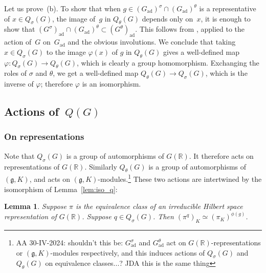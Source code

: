 \documentclass[10pt,leqno]{article}
\newtheorem{lemma}[equation]{Lemma}
\newcommand{\ad}{\mathrm{ad}}
\newcommand{\Gad}{G_\mathrm{ad}}
\newcommand{\R}{\mathbb R}
\newcommand{\g}{\mathfrak g}
\begin{document}
Let us prove~(b). To show that when $g\in (\Gad)^\sigma \cap (\Gad)^\theta$ is a representative of $x \in Q_{\sigma}(G)$,  the image of~$g$ in  $Q_\theta(G)$ depends only on~$x$, it is enough to show that  $(G^\sigma)_\ad \cap (\Gad)^\theta \subset (G^\theta)_{\ad}$. This follows from \cite[Proposition 5.4]{galois}, applied to the action of~$G$ on~$\Gad$ and the obvious involutions. We conclude that taking $x \in Q_{\sigma}(G)$ to the image $\varphi(x)$ of $g$ in $Q_{\theta}(G)$ gives a well-defined map $\varphi\colon Q_{\sigma}(G)\to Q_{\theta}(G)$, which is clearly a group homomorphism. Exchanging the roles of $\sigma$ and $\theta$, we get a well-defined map $Q_{\theta}(G) \to Q_{\sigma}(G)$, which is the inverse of $\varphi$; therefore $\varphi$ is an isomorphism.

%


\subsection{Actions of~$Q(G)$}


\subsubsection*{On representations} 



Note that $Q_\sigma(G)$ is a group of automorphisms of $G(\R)$. It therefore acts on representations of $G(\R)$. 
Similarly $Q_\theta(G)$ is a group of automorphisms of $(\g,K)$, and acts on $(\g,K)$-modules.\footnote{AA 30-IV-2024: shouldn't this be:  $\Gad^\sigma$ and $\Gad^\theta$  act on $G(\R)$-representations or $(\g,K)$-modules respectively, and this induces actions of $Q_{\sigma}(G)$ and $Q_{\theta}(G)$ on equivalence classes...? JDA this is the same thing}
These two actions are intertwined by the isomorphism of Lemma~\ref{lem:iso_q}:

\begin{lemma}\label{lem:action_q}
Suppose $\pi$ is the equivalence class of an irreducible Hilbert space representation of $G(\R)$. 
Suppose $q\in Q_\sigma(G)$. 
Then $(\pi^q)_K\simeq (\pi_K)^{\phi(g)}$.
\end{lemma}
\end{document}
